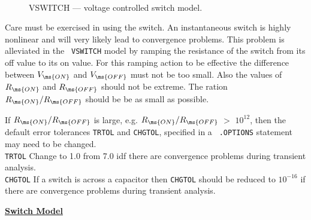 
\begin{figure}[h]
\centering \  \caption{VSWITCH --- voltage
controlled switch model. \label{vswitch}}
\end{figure}


Care must be exercised in using the switch. An instantaneous
switch is highly nonlinear and will very likely lead to
convergence problems. This problem is alleviated in the {\tt
VSWITCH} model by ramping the resistance of the switch from its
off value to its on value.  For this ramping action to be
effective the difference between $V_{\ms{ON}}$ and $V_{\ms{OFF}}$
must not be too small. Also the values of $R_{\ms{ON}}$ and
$R_{\ms{OFF}}$ should not be extreme. The ration
$R_{\ms{ON}}/R_{\ms{OFF}}$ should be be as small as possible.

If $R_{\ms{ON}}/R_{\ms{OFF}}$  is large, e.g.
$R_{\ms{ON}}/R_{\ms{OFF}}$ $>$ $10^{12}$, then the default error
tolerances {\tt TRTOL} and {\tt CHGTOL}, specified in a {\tt
.OPTIONS} statement may need to be changed.\\
{\tt TRTOL} Change to 1.0 from 7.0 idf there are convergence
problems during transient analysis.\\
{\tt CHGTOL} If a switch is across a capacitor then {\tt CHGTOL}
should be reduced to $10^{-16}$ if there are convergence problems
during transient analysis.

\noindent\underline{\bf \large Switch Model}\\[0.1in]

